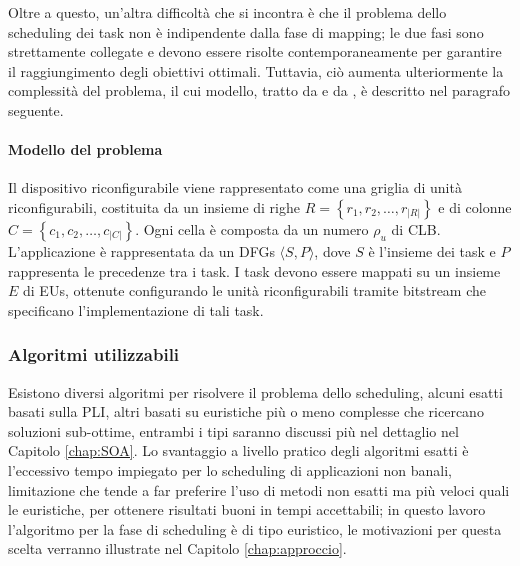 Oltre a questo, un'altra difficoltà che si incontra è che il problema dello scheduling 
dei task non è indipendente dalla fase di mapping; le due fasi sono strettamente 
collegate e devono essere risolte contemporaneamente per garantire il raggiungimento 
degli obiettivi ottimali. Tuttavia, ciò aumenta ulteriormente la complessità del 
problema, il cui modello, tratto da \cite{ModelloRedaelli} e da 
\cite{ReconfigurableSystemDesignVerification}, è descritto nel paragrafo seguente.


\paragraph{Modello del problema}
Il dispositivo riconfigurabile viene rappresentato come una griglia di unità 
riconfigurabili, costituita da un insieme di righe $R=\left\{r_1, r_2, \dots, 
r_{\vert R \vert}\right\}$ e di colonne $C=\left\{c_1, c_2, \dots, c_{\vert C 
\vert}\right\}$. Ogni cella è composta da un numero $\rho_{u}$ di \ac{CLB}. 
L'applicazione è rappresentata da un \acp{DFG} $\langle S, P \rangle$, dove $S$ è 
l'insieme dei task e $P$ rappresenta le precedenze tra i task. I task devono essere 
mappati su un insieme $E$ di \acp{EU}, ottenute configurando le unità riconfigurabili 
tramite bitstream che specificano l'implementazione di tali task.


\subsubsection{Algoritmi utilizzabili}
Esistono diversi algoritmi per risolvere il problema dello scheduling, alcuni esatti 
basati sulla \ac{PLI}, altri basati su euristiche più o meno complesse che ricercano 
soluzioni sub-ottime, entrambi i tipi saranno discussi più nel dettaglio nel Capitolo 
\ref{chap:SOA}. Lo svantaggio a livello pratico degli algoritmi esatti è l'eccessivo tempo 
impiegato per lo scheduling di applicazioni non banali, limitazione che tende a far 
preferire l'uso di metodi non esatti ma più veloci quali le euristiche, per ottenere 
risultati buoni in tempi accettabili; in questo lavoro l'algoritmo per la fase di 
scheduling è di tipo euristico, le motivazioni per questa scelta verranno illustrate nel 
Capitolo \ref{chap:approccio}.



